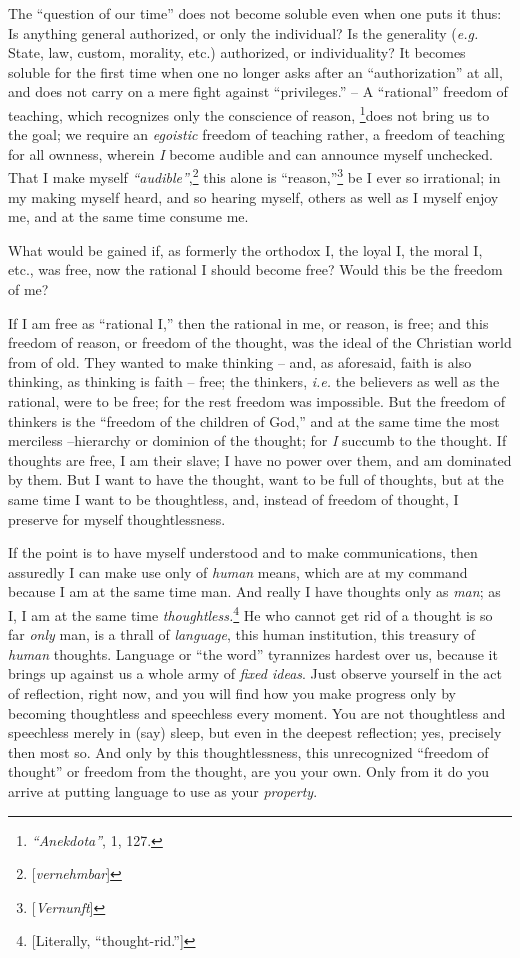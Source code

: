 The ``question of our time'' does not become soluble even when one puts it 
thus: Is anything general authorized, or only the individual? Is the 
generality (\textit{e.g.} State, law, custom, morality, etc.) authorized, or 
individuality? It becomes soluble for the first time when one no longer asks 
after an ``authorization'' at all, and does not carry on a mere fight 
against ``privileges.'' -- A ``rational'' freedom of teaching, which 
recognizes only the conscience of reason, \footnote{\textit{``Anekdota''}, 
1, 127. }does not bring us to the goal; we require an \textit{egoistic} 
freedom of teaching rather, a freedom of teaching for all ownness, wherein 
\textit{I} become audible and can announce myself unchecked. That I make 
myself \textit{``audible''},\footnote{[\textit{vernehmbar}]} this alone is 
``reason,''\footnote{[\textit{Vernunft}]} be I ever so irrational; in my 
making myself heard, and so hearing myself, others as well as I myself enjoy 
me, and at the same time consume me.

What would be gained if, as formerly the orthodox I, the loyal I, the moral I, 
etc., was free, now the rational I should become free? Would this be the 
freedom of me?

If I am free as ``rational I,'' then the rational in me, or reason, is free; 
and this freedom of reason, or freedom of the thought, was the ideal of the 
Christian world from of old. They wanted to make thinking -- and, as 
aforesaid, faith is also thinking, as thinking is faith -- free; the thinkers, 
\textit{i.e.} the believers as well as the rational, were to be free; for the 
rest freedom was impossible. But the freedom of thinkers is the ``freedom of 
the children of God,'' and at the same time the most merciless --hierarchy or 
dominion of the thought; for \textit{I} succumb to the thought. If thoughts 
are free, I am their slave; I have no power over them, and am dominated by 
them. But I want to have the thought, want to be full of thoughts, but at the 
same time I want to be thoughtless, and, instead of freedom of thought, I 
preserve for myself thoughtlessness.

If the point is to have myself understood and to make communications, then 
assuredly I can make use only of \textit{human} means, which are at my command 
because I am at the same time man. And really I have thoughts only as 
\textit{man}; as I, I am at the same time 
\textit{thoughtless.}\footnote{[Literally, ``thought-rid.'']} He who cannot 
get rid of a thought is so far \textit{only} man, is a thrall of 
\textit{language}, this human institution, this treasury of \textit{human} 
thoughts. Language or ``the word'' tyrannizes hardest over us, because it 
brings up against us a whole army of \textit{fixed ideas}. Just observe 
yourself in the act of reflection, right now, and you will find how you make 
progress only by becoming thoughtless and speechless every moment. You are not 
thoughtless and speechless merely in (say) sleep, but even in the deepest 
reflection; yes, precisely then most so. And only by this thoughtlessness, 
this unrecognized ``freedom of thought'' or freedom from the thought, are 
you your own. Only from it do you arrive at putting language to use as your 
\textit{property}.

